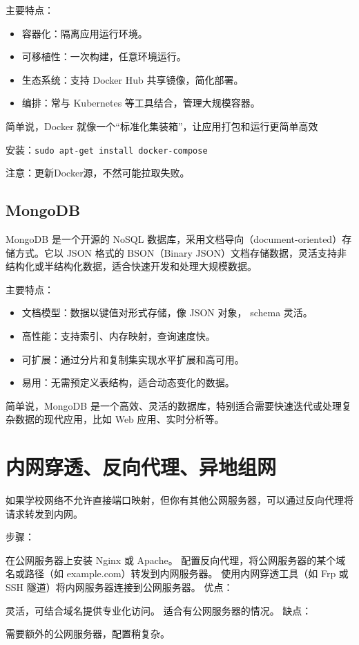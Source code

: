 主要特点：
\begin{itemize}
\item 容器化：隔离应用运行环境。
\item 可移植性：一次构建，任意环境运行。
\item 生态系统：支持 Docker Hub 共享镜像，简化部署。
\item 编排：常与 Kubernetes 等工具结合，管理大规模容器。
\end{itemize}
简单说，Docker 就像一个“标准化集装箱”，让应用打包和运行更简单高效

安装：\verb|sudo apt-get install docker-compose|

注意：更新Docker源，不然可能拉取失败。


\section{MongoDB}
MongoDB 是一个开源的 NoSQL 数据库，采用文档导向（document-oriented）存储方式。它以 JSON 格式的 BSON（Binary JSON）文档存储数据，灵活支持非结构化或半结构化数据，适合快速开发和处理大规模数据。

主要特点：
\begin{itemize}
\item 文档模型：数据以键值对形式存储，像 JSON 对象， schema 灵活。
\item 高性能：支持索引、内存映射，查询速度快。
\item 可扩展：通过分片和复制集实现水平扩展和高可用。
\item 易用：无需预定义表结构，适合动态变化的数据。
\end{itemize}
简单说，MongoDB 是一个高效、灵活的数据库，特别适合需要快速迭代或处理复杂数据的现代应用，比如 Web 应用、实时分析等。



\chapter{内网穿透、反向代理、异地组网}
如果学校网络不允许直接端口映射，但你有其他公网服务器，可以通过反向代理将请求转发到内网。

步骤：

在公网服务器上安装 Nginx 或 Apache。
配置反向代理，将公网服务器的某个域名或路径（如 example.com）转发到内网服务器。
使用内网穿透工具（如 Frp 或 SSH 隧道）将内网服务器连接到公网服务器。
优点：

灵活，可结合域名提供专业化访问。
适合有公网服务器的情况。
缺点：

需要额外的公网服务器，配置稍复杂。


